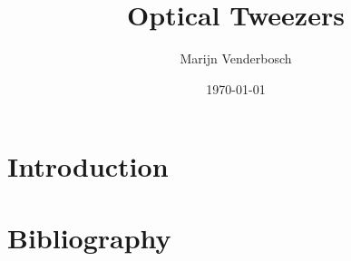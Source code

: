 \documentclass[a4paper,11pt,twoside]{report}
\title{
	\Huge{\textsf{Optical Tweezers}}
}
\author{
	\large \textsf{Marijn Venderbosch}
}
\date{\normalsize \textsf{\today}}
\begin{document}

%
%



\tableofcontents
\newpage





\chapter{Introduction}\label{introduction}



\clearpage
\chapter*{Bibliography}

\printbibliography[heading=none]



\begin{appendices}

 \renewcommand{\thesection}{A.\arabic{section}}
 \renewcommand\thefigure{A.\arabic{figure}}
 \renewcommand\theequation{A.\arabic{equation}}
 
 \setcounter{equation}{0}
 \setcounter{figure}{0}
 
 
 
\end{appendices}
\end{document}
